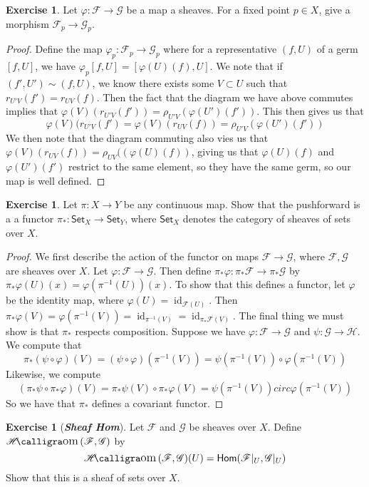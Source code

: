 \documentclass[psamsfonts]{amsart}
\theoremstyle{definition}
\newtheorem{exer}[thm]{Exercise}
\theoremstyle{remark}
\renewcommand{\hom}{\mathsf{Hom}}
\newcommand{\ib}[1]{\textbf{\textit{#1}}}
\newcommand{\inv}{^{-1}}
\DeclareMathOperator{\id}{id}
\DeclareMathOperator{\sheafhom}{\mathscr{H}\text{\kern -3pt {\calligra\large om}}\,}
\begin{document}
%
\begin{exer}
Let $\varphi : \mathscr{F} \to \mathscr{G}$ be a map a sheaves. For a fixed point $p \in X$, give a morphism $\mathscr{F}_p \to \mathscr{G}_p$.
\end{exer}
%
\begin{proof}
Define the map $\varphi_p : \mathscr{F}_p \to \mathscr{G}_p$ where for a representative $(f,U)$ of a germ $[f,U]$, we have $\varphi_p[f,U] = [\varphi(U)(f),U]$. We note that if $(f',U') \sim (f,U)$, we know there exists some $V \subset U$ such that $r_{U'V}(f') = r_{UV}(f)$. Then the fact that the diagram we have above commutes implies that $\varphi(V)(r_{U'V}(f')) = \rho_{U'V}(\varphi(U')(f'))$. This then gives us that 
$$\varphi(V)(r_{U'V}(f') = \varphi(V)(r_{UV}(f)) = \rho_{U'V}(\varphi(U')(f')) $$
We then note that the diagram commuting also vies us that $\varphi(V)(r_{UV}(f)) = \rho_{UV}((\varphi(U)(f))$, giving us that $\varphi(U)(f)$ and $\varphi(U')(f')$ restrict to the same element, so they have the same germ, so our map is well defined.
\end{proof}
%
\begin{exer}
Let $\pi : X \to Y$ be any continuous map. Show that the pushforward is a a functor $\pi_* : \mathsf{Set}_X \to \mathsf{Set}_Y$, where $\mathsf{Set}_X$ denotes the category of sheaves of sets over $X$.
\end{exer}
%
\begin{proof}
We first describe the action of the functor on maps $\mathscr{F} \to \mathscr{G}$, where $\mathscr{F},\mathscr{G}$ are sheaves over $X$. Let $\varphi : \mathscr{F} \to \mathscr{G}$. Then define $\pi_*\varphi : \pi_*\mathscr{F} \to \pi_*\mathscr{G}$ by $\pi_*\varphi(U)(x) = \varphi(\pi\inv(U))(x)$. To show that this defines a functor, let $\varphi$ be the identity map, where $\varphi(U) = \id_{\mathscr{F}(U)}$. Then $\pi_*\varphi(V) = \varphi(\pi\inv(V)) = \id_{\pi\inv(V)} = \id_{\pi_*\mathscr{F}(V)}$. The final thing we must show is that $\pi_*$ respects composition. Suppose we have $\varphi : \mathscr{F} \to \mathscr{G}$ and $\psi : \mathscr{G} \to \mathscr{H}$. We compute that 
$$\pi_*(\psi \circ \varphi)(V) = (\psi \circ \varphi)(\pi\inv(V)) = \psi(\pi\inv(V)) \circ \varphi(\pi\inv(V))$$
Likewise, we compute
$$(\pi_*\psi \circ \pi_*\varphi)(V) = \pi_*\psi(V) \circ \pi_*\varphi(V) = \psi(\pi\inv(V)) circ \varphi(\pi\inv(V)) $$
So we have that $\pi_*$ defines a covariant functor.
\end{proof}
%
\begin{exer}[\ib{Sheaf Hom}]
Let $\mathscr{F}$ and $\mathscr{G}$ be sheaves over $X$. Define $\sheafhom(\mathscr{F},\mathscr{G})$ by 
$$\sheafhom(\mathscr{F},\mathscr{G})(U) = \hom(\mathscr{F}\vert_U, \mathscr{G}\vert_U)$$
Show that this is a sheaf of sets over $X$.
\end{exer}
\end{document}
